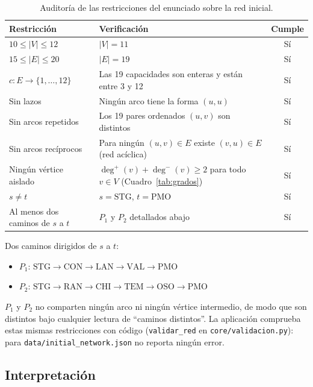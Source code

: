 \documentclass[12pt, a4paper]{article}
\begin{document}
\begin{table}[H]
  \centering
  \begin{tabular}{p{4.6cm}p{7.4cm}c}
    \toprule
    \textbf{Restricción} & \textbf{Verificación} & \textbf{Cumple} \\
    \midrule
    $10 \le \lvert V\rvert \le 12$ & $\lvert V\rvert = 11$ & Sí \\
    $15 \le \lvert E\rvert \le 20$ & $\lvert E\rvert = 19$ & Sí \\
    $c: E \to \{1,\dots,12\}$ & Las 19 capacidades son enteras y están entre 3 y 12 & Sí \\
    Sin lazos & Ningún arco tiene la forma $(u,u)$ & Sí \\
    Sin arcos repetidos & Los 19 pares ordenados $(u,v)$ son distintos & Sí \\
    Sin arcos recíprocos & Para ningún $(u,v) \in E$ existe $(v,u) \in E$ (red acíclica) & Sí \\
    Ningún vértice aislado & $\deg^+(v) + \deg^-(v) \ge 2$ para todo $v \in V$ (Cuadro~\ref{tab:grados}) & Sí \\
    $s \ne t$ & $s = \text{STG}$, $t = \text{PMO}$ & Sí \\
    Al menos dos caminos de $s$ a $t$ & $P_1$ y $P_2$ detallados abajo & Sí \\
    \bottomrule
  \end{tabular}
  \caption{Auditoría de las restricciones del enunciado sobre la red inicial.}
  \label{tab:auditoria}
\end{table}

Dos caminos dirigidos de $s$ a $t$:
\begin{itemize}
  \item $P_1$: $\text{STG} \to \text{CON} \to \text{LAN} \to \text{VAL} \to \text{PMO}$
  \item $P_2$: $\text{STG} \to \text{RAN} \to \text{CHI} \to \text{TEM} \to \text{OSO} \to \text{PMO}$
\end{itemize}

$P_1$ y $P_2$ no comparten ningún arco ni ningún vértice intermedio, de modo que son distintos bajo cualquier lectura de ``caminos distintos''. La aplicación comprueba estas mismas restricciones con código (\texttt{validar\_red} en \texttt{core/validacion.py}): para \texttt{data/initial\_network.json} no reporta ningún error.

\subsection{Interpretación}
\end{document}
